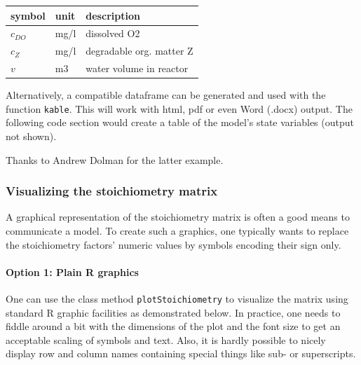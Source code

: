 \documentclass[times,onecolumn]{article}
\begin{document}
\bigskip
\begin{center}
  \begin{tabular}{lll}\hline
    \textbf{symbol} & \textbf{unit} & \textbf{description} \\ \hline
    $c_{DO}$ & mg/l & dissolved O2 \\
    $c_Z$ & mg/l & degradable org. matter Z \\
    $v$ & m3 & water volume in reactor \\ \hline
  \end{tabular}\end{center}

\bigskip
Alternatively, a  compatible dataframe can be generated and used with the  function \verb|kable|. This will work with html, pdf or even Word (.docx) output. The following code section would create a table of the model's state variables (output not shown).

\begin{Schunk}
\end{Schunk}


Thanks to Andrew Dolman for the latter example.

\subsubsection{Visualizing the stoichiometry matrix} \label{sec:advanced:doc:stoi}

A graphical representation of the stoichiometry matrix is often a good means to communicate a model. To create such a graphics, one typically wants to replace the stoichiometry factors' numeric values by symbols encoding their sign only.

\paragraph{Option 1: Plain R graphics}
One can use the class method \verb|plotStoichiometry| to visualize the matrix using standard R graphic facilities as demonstrated below. In practice, one needs to fiddle around a bit with the dimensions of the plot and the font size to get an acceptable scaling of symbols and text. Also, it is hardly possible to nicely display row and column names containing special things like sub- or superscripts.
\end{document}
